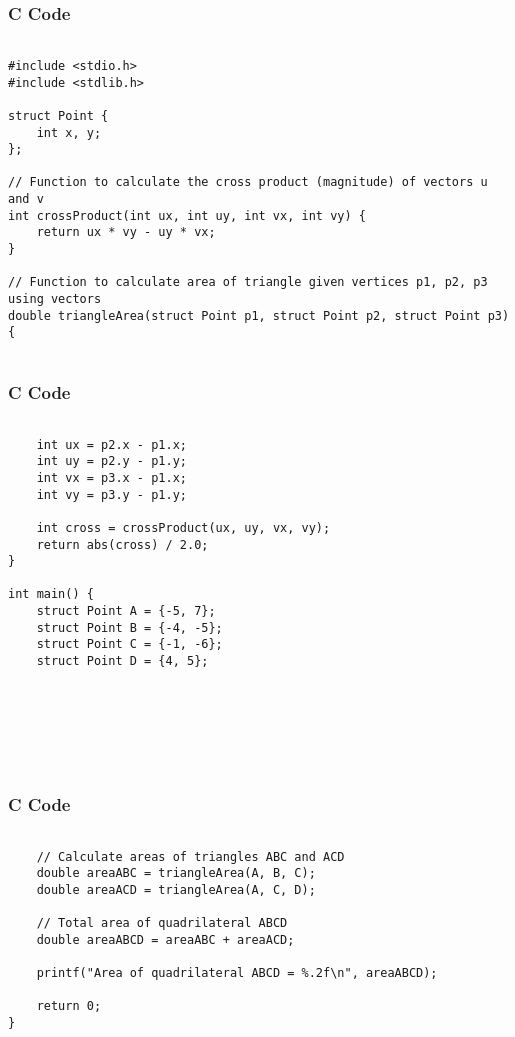 \documentclass{beamer}
\begin{document}
\begin{frame}[fragile]
    \frametitle{C Code }
    \begin{lstlisting}

#include <stdio.h>
#include <stdlib.h>

struct Point {
    int x, y;
};

// Function to calculate the cross product (magnitude) of vectors u and v
int crossProduct(int ux, int uy, int vx, int vy) {
    return ux * vy - uy * vx;
}

// Function to calculate area of triangle given vertices p1, p2, p3 using vectors
double triangleArea(struct Point p1, struct Point p2, struct Point p3) {


    \end{lstlisting}
\end{frame}

\begin{frame}[fragile]
    \frametitle{C Code }
    \begin{lstlisting}

    int ux = p2.x - p1.x;
    int uy = p2.y - p1.y;
    int vx = p3.x - p1.x;
    int vy = p3.y - p1.y;

    int cross = crossProduct(ux, uy, vx, vy);
    return abs(cross) / 2.0;
}

int main() {
    struct Point A = {-5, 7};
    struct Point B = {-4, -5};
    struct Point C = {-1, -6};
    struct Point D = {4, 5};







    \end{lstlisting}
\end{frame}


\begin{frame}[fragile]
    \frametitle{C Code}
    \begin{lstlisting}

    // Calculate areas of triangles ABC and ACD
    double areaABC = triangleArea(A, B, C);
    double areaACD = triangleArea(A, C, D);

    // Total area of quadrilateral ABCD
    double areaABCD = areaABC + areaACD;

    printf("Area of quadrilateral ABCD = %.2f\n", areaABCD);

    return 0;
}


    \end{lstlisting}
\end{frame}
\end{document}
